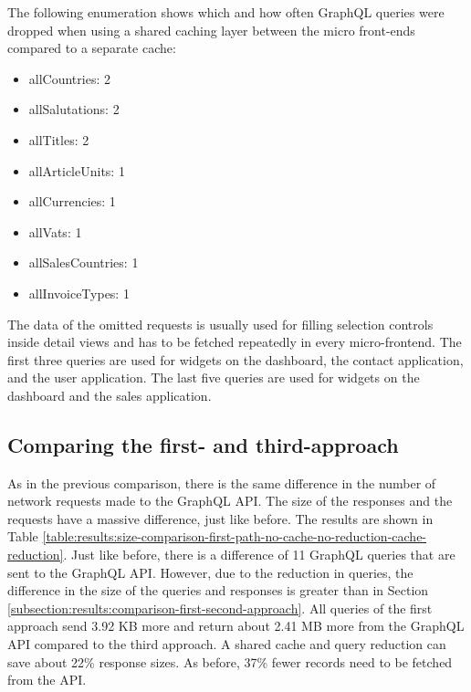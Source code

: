\noindent The following enumeration shows which and how often GraphQL queries were dropped when using a shared caching layer between the micro front-ends compared to a separate cache:

\begin{itemize}
  \item allCountries: 2
  \item allSalutations: 2
  \item allTitles: 2
  \item allArticleUnits: 1
  \item allCurrencies: 1
  \item allVats: 1
  \item allSalesCountries: 1
  \item allInvoiceTypes: 1
\end{itemize}

\noindent The data of the omitted requests is usually used for filling selection controls inside detail views and has to be fetched repeatedly in every micro-frontend. The first three queries are used for widgets on the dashboard, the contact application, and the user application. The last five queries are used for widgets on the dashboard and the sales application.

\subsection{Comparing the first- and third-approach}\label{subsection:results:comparison-first-third-approach}

As in the previous comparison, there is the same difference in the number of network requests made to the GraphQL \ac{API}. The size of the responses and the requests have a massive difference, just like before. The results are shown in Table \ref{table:results:size-comparison-first-path-no-cache-no-reduction-cache-reduction}. Just like before, there is a difference of 11 GraphQL queries that are sent to the GraphQL \ac{API}. However, due to the reduction in queries, the difference in the size of the queries and responses is greater than in Section \ref{subsection:results:comparison-first-second-approach}. All queries of the first approach send 3.92 KB more and return about 2.41 MB more from the GraphQL \ac{API} compared to the third approach. A shared cache and query reduction can save about 22\% response sizes. As before, 37\% fewer records need to be fetched from the \ac{API}.

